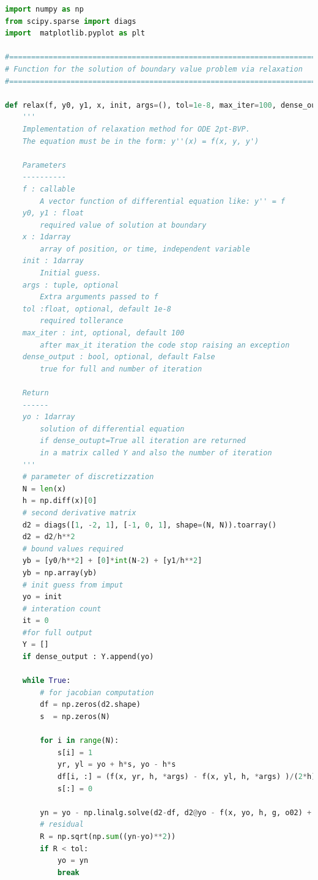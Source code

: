 \documentclass[10pt,a4paper]{article}
\begin{document}
\begin{lstlisting}[language=Python]
import numpy as np
from scipy.sparse import diags
import  matplotlib.pyplot as plt

#=================================================================================
# Function for the solution of boundary value problem via relaxation
#=================================================================================

def relax(f, y0, y1, x, init, args=(), tol=1e-8, max_iter=100, dense_output=False):
    '''
    Implementation of relaxation method for ODE 2pt-BVP.
    The equation must be in the form: y''(x) = f(x, y, y')
   
    Parameters
    ----------
    f : callable
        A vector function of differential equation like: y'' = f
    y0, y1 : float
        required value of solution at boundary
    x : 1darray
        array of position, or time, independent variable
    init : 1darray 
        Initial guess.
    args : tuple, optional
        Extra arguments passed to f
    tol :float, optional, default 1e-8
        required tollerance
    max_iter : int, optional, default 100
        after max_it iteration the code stop raising an exception
    dense_output : bool, optional, default False
        true for full and number of iteration
    
    Return
    ------
    yo : 1darray
        solution of differential equation
        if dense_outupt=True all iteration are returned
        in a matrix called Y and also the number of iteration
    '''
    # parameter of discretizzation
    N = len(x)
    h = np.diff(x)[0]
    # second derivative matrix
    d2 = diags([1, -2, 1], [-1, 0, 1], shape=(N, N)).toarray()
    d2 = d2/h**2
    # bound values required
    yb = [y0/h**2] + [0]*int(N-2) + [y1/h**2]
    yb = np.array(yb)
    # init guess from imput
    yo = init
    # interation count
    it = 0
    #for full output
    Y = []
    if dense_output : Y.append(yo)
    
    while True:
        # for jacobian computation
        df = np.zeros(d2.shape)
        s  = np.zeros(N)

        for i in range(N):
            s[i] = 1
            yr, yl = yo + h*s, yo - h*s
            df[i, :] = (f(x, yr, h, *args) - f(x, yl, h, *args) )/(2*h)
            s[:] = 0

        yn = yo - np.linalg.solve(d2-df, d2@yo - f(x, yo, h, g, o02) + yb)
        # residual
        R = np.sqrt(np.sum((yn-yo)**2))
        if R < tol:
            yo = yn
            break
            

\end{lstlisting}
\end{document}
